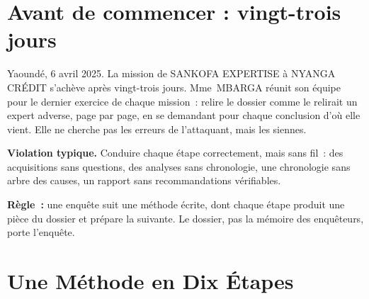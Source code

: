 \section*{Avant de commencer : vingt-trois jours}

Yaoundé, 6 avril 2025. La mission de SANKOFA EXPERTISE à NYANGA CRÉDIT
s'achève après vingt-trois jours. Mme~MBARGA réunit son équipe pour le
dernier exercice de chaque mission~: relire le dossier comme le relirait un
expert adverse, page par page, en se demandant pour chaque conclusion d'où
elle vient. Elle ne cherche pas les erreurs de l'attaquant, mais les siennes.

\begin{boxalert}
\textbf{Violation typique.} Conduire chaque étape correctement, mais sans
fil~: des acquisitions sans questions, des analyses sans chronologie, une
chronologie sans arbre des causes, un rapport sans recommandations
vérifiables.

\smallskip
\textbf{Règle~:} une enquête suit une méthode écrite, dont chaque étape
produit une pièce du dossier et prépare la suivante. Le dossier, pas la
mémoire des enquêteurs, porte l'enquête.
\end{boxalert}

\separateur

\section{Une Méthode en Dix Étapes}
\label{sec:c14-methode}

